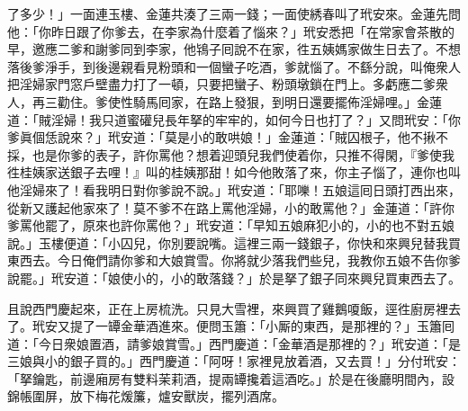 了多少！」一面連玉樓、金蓮共湊了三兩一錢；一面使綉春叫了玳安來。金蓮先問他：「你昨日跟了你爹去，在李家為什麼着了惱來？」{}玳安悉把「在常家會茶散的早，邀應二爹和謝爹同到李家，他鴇子囘說不在家，徃五姨媽家做生日去了。不想落後爹淨手，到後邊親看見粉頭和一個蠻子吃酒，爹就惱了。不繇分說，叫俺衆人把淫婦家門窓戶壁盡力打了一頓，只要把蠻子、粉頭墩鎖在門上。多虧應二爹衆人，再三勸住。爹使性騎馬囘家，在路上發狠，到明日還要擺佈淫婦哩。」金蓮道：「賊淫婦！我只道蜜礶兒長年拏的牢牢的，如何今日也打了？」又問玳安：「你爹眞個恁說來？」{}玳安道：「莫是小的敢哄娘！」金蓮道：「賊囚根子，他不揪不採，也是你爹的表子，許你罵他？{}想着迎頭兒我們使着你，只推不得閑，『爹使我徃桂姨家送銀子去哩！』叫的桂姨那甜！如今他敗落了來，你主子惱了，連你也叫他淫婦來了！看我明日對你爹說不說。」玳安道：「耶嚛！五娘這囘日頭打西出來，從新又護起他家來了！莫不爹不在路上罵他淫婦，小的敢罵他？」金蓮道：「許你爹罵他罷了，原來也許你罵他？」玳安道：「早知五娘麻犯小的，小的也不對五娘說。」玉樓便道：「小囚兒，你別要說嘴。{}這裡三兩一錢銀子，你快和來興兒替我買東西去。今日俺們請你爹和大娘賞雪。你將就少落我們些兒，我教你五娘不告你爹說罷。」玳安道：「娘使小的，小的敢落錢？」於是拏了銀子同來興兒買東西去了。

且說西門慶起來，正在上房梳洗。只見大雪裡，來興買了雞鵝嗄飯，逕徃廚房裡去了。玳安又提了一罈金華酒進來。便問玉簫：「小厮的東西，是那裡的？」玉簫囘道：「今日衆娘置酒，請爹娘賞雪。」西門慶道：「金華酒是那裡的？」玳安道：「是三娘與小的銀子買的。」西門慶道：「阿呀！家裡見放着酒，又去買！」分付玳安：「拏鑰匙，前邊廂房有雙料茉莉酒，提兩罈攙着這酒吃。」於是在後廳明間內，設錦帳圍屏，放下梅花煖簾，爐安獸炭，擺列酒席。

